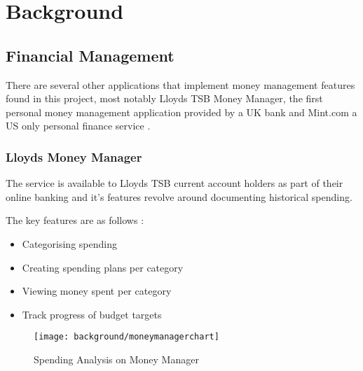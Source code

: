 \chapter{Background}
\label{cha:background}

\begin{comment}
Chapter 2: Background and literature survey
This chapter should give essential background information with references to published material in research papers, books, URLs, magazine articles and even newspapers. Expand on any references to other work that have been mentioned in Chapter 1. Refer to the notes on references (below) for the preferred way of referencing publications. The reader, stimulated by the presentation of ideas in this section, may be led to consult some or all of the referenced publications. This section will be useful for any student in a subsequent year who wishes to take the project further.
\end{comment}

\section{Financial Management}
There are several other applications that implement money management features found in this project, most notably Lloyds TSB Money Manager, the first personal money management application provided by a UK bank and Mint.com a US only personal finance service \parencite{lloyds2014moneymanager, mint2014whatismint}.

\subsection{Lloyds Money Manager}
The service is available to Lloyds TSB current account holders as part of their online banking and it's features revolve around documenting historical spending.

The key features are as follows \parencite{lloyds2014money}:
\begin{itemize}
\item Categorising spending
\item Creating spending plans per category
\item Viewing money spent per category
\item Track progress of budget targets
\end{itemize}

\begin{figure}[h]
    \centering
    \texttt{[image: background/moneymanagerchart]}
    \caption{Spending Analysis on Money Manager \parencite{lloyds2014money}}
    \label{fig:moneymanager}
\end{figure}

